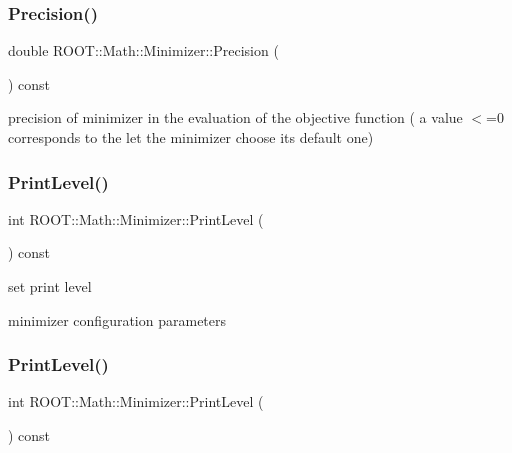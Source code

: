 \subsubsection{\texorpdfstring{Precision()}{Precision()}\hspace{0.1cm}{\footnotesize\ttfamily [3/3]}}
{\footnotesize\ttfamily double R\+O\+O\+T\+::\+Math\+::\+Minimizer\+::\+Precision (\begin{DoxyParamCaption}{ }\end{DoxyParamCaption}) const\hspace{0.3cm}{\ttfamily [inline]}}

precision of minimizer in the evaluation of the objective function ( a value $<$=0 corresponds to the let the minimizer choose its default one) \mbox{\label{classROOT_1_1Math_1_1Minimizer_ae6c76dc2f3073f19edf22561866c2f9c}} 
\subsubsection{\texorpdfstring{PrintLevel()}{PrintLevel()}\hspace{0.1cm}{\footnotesize\ttfamily [1/3]}}
{\footnotesize\ttfamily int R\+O\+O\+T\+::\+Math\+::\+Minimizer\+::\+Print\+Level (\begin{DoxyParamCaption}{ }\end{DoxyParamCaption}) const\hspace{0.3cm}{\ttfamily [inline]}}



set print level 

minimizer configuration parameters \mbox{\label{classROOT_1_1Math_1_1Minimizer_ae6c76dc2f3073f19edf22561866c2f9c}} 
\subsubsection{\texorpdfstring{PrintLevel()}{PrintLevel()}\hspace{0.1cm}{\footnotesize\ttfamily [2/3]}}
{\footnotesize\ttfamily int R\+O\+O\+T\+::\+Math\+::\+Minimizer\+::\+Print\+Level (\begin{DoxyParamCaption}{ }\end{DoxyParamCaption}) const\hspace{0.3cm}{\ttfamily [inline]}}



